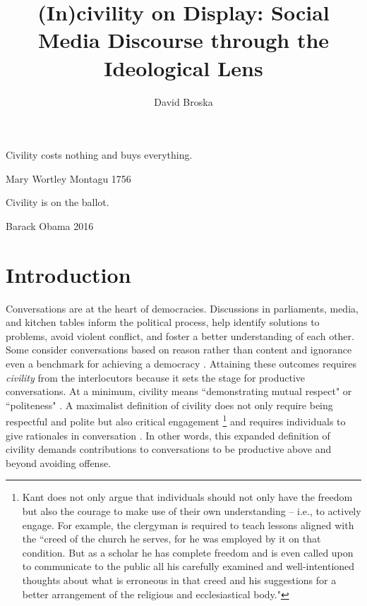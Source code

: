 \documentclass{article}
\title{(In)civility on Display: Social Media Discourse through the Ideological Lens}
\author[1]{David Broska}
\begin{document}
\maketitle

\epigraph{Civility costs nothing and buys everything.}{Mary Wortley Montagu 1756}
\epigraph{Civility is on the ballot.}{Barack Obama 2016}

\section{Introduction}

Conversations are at the heart of democracies. Discussions in parliaments, media, and kitchen tables inform the political process, help identify solutions to problems, avoid violent conflict, and foster a better understanding of each other. Some consider conversations based on reason rather than content and ignorance even a benchmark for achieving a democracy \citep{sanders_against_1997}. Attaining these outcomes requires \textit{civility} from the interlocutors because it sets the stage for productive conversations. 
At a minimum,  civility means ``demonstrating mutual respect" \citep{mutz_inyourface_2016} or ``politeness" \citep{frimer_montagu_2018}. A maximalist definition of civility does not only require being respectful and polite but also critical engagement \citep{kant_enlightenment_1784}\footnote{Kant does not only argue that individuals should not only have the freedom but also the courage to make use of their own understanding -- i.e., to actively engage. For example, the clergyman is required to teach lessons aligned with the ``creed of the church he serves, for he was employed by it on that condition. But as a scholar he has complete freedom and is even called upon to communicate to the public all his carefully examined and well-intentioned thoughts about what is erroneous in that creed and his suggestions for a better arrangement of the religious and ecclesiastical body."} and requires individuals to give rationales in conversation \citep{habermas1985theory}. In other words, this expanded definition of civility demands contributions to conversations to be productive above and beyond avoiding offense.
\end{document}
